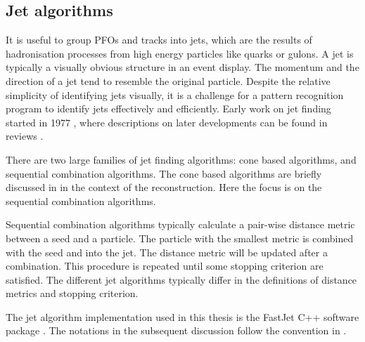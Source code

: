 \subsection{Jet algorithms}
\label{sec:pandoraJetAlg}


It is useful to group PFOs and tracks into jets, which are the results of hadronisation processes from high energy particles like quarks or gulons. A jet is typically a visually obvious structure in an event display. The momentum and the direction of a jet tend to resemble the original particle. Despite the relative simplicity of identifying jets visually, it is a challenge for a pattern recognition program to identify jets effectively and efficiently. Early work on jet finding started in 1977 \cite{Sterman:1977wj}, where descriptions on later developments can be found in reviews \cite{Moretti:1998qx,Salam:2009jx,Ali:2010tw}.

There are two large families of jet finding algorithms: cone based algorithms, and sequential combination algorithms. The cone based algorithms are briefly discussed in  in the context of the \pandora reconstruction. Here the focus is on the sequential combination algorithms.

Sequential combination algorithms typically calculate a pair-wise distance metric between a seed and a particle. The particle with the smallest metric is combined with the seed and  into the jet. The distance metric will be updated after a combination. This procedure is repeated until some stopping criterion are satisfied. The different jet algorithms typically differ in the definitions of  distance metrics and stopping criterion.

The jet algorithm implementation used in this thesis is the FastJet C++ software package \cite{Cacciari:2011ma,Cacciari:2005hq}. The notations in the subsequent discussion follow the convention in \cite{Cacciari:2011ma}.


